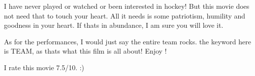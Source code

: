 \documentclass[]{article}
\begin{document}
I have never played or watched or been interested in hockey! But this movie does not need that to touch your heart. All it needs is some patriotism, humility and goodness in your heart. If thats in abundance, I am sure you will love it.

As for the performances, I would just say the entire team rocks. the keyword here is TEAM, as thats what this film is all about! Enjoy !

I rate this movie 7.5/10. :)
\end{document}
